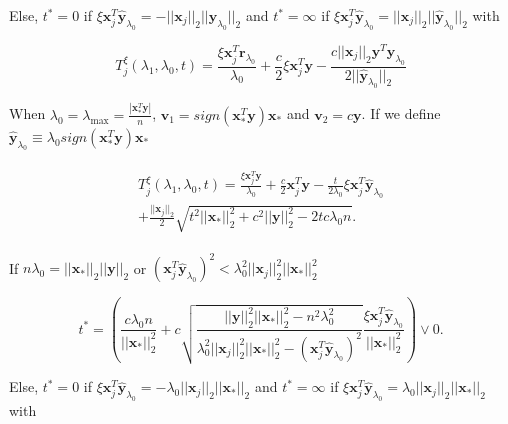 Else, $t^*=0$ if $\xi\boldsymbol x_j^T\hat{\boldsymbol y}_{\lambda_0}=-||\boldsymbol x_j||_2||\hat{\boldsymbol y}_{\lambda_0}||_2$ and $t^*=\infty$ if $\xi\boldsymbol x_j^T\hat{\boldsymbol y}_{\lambda_0}=||\boldsymbol x_j||_2||\hat{\boldsymbol y}_{\lambda_0}||_2$ with

\begin{equation}
    T^\xi_j(\lambda_1,\lambda_0,t)=\frac{\xi \boldsymbol x_j^T \boldsymbol r_{\lambda_0}}{\lambda_0}+\frac{c}{2}\xi\boldsymbol x_j^T\boldsymbol y-\frac{c||\boldsymbol x_j||_2\boldsymbol y^T\hat{\boldsymbol y}_{\lambda_0}}{2||\hat{\boldsymbol y}_{\lambda_0}||_2}
\end{equation}

When $\lambda_0=\lambda_{\max}=\frac{|\boldsymbol x_*^T\boldsymbol y|}{n}$, $\boldsymbol v_1=sign(\boldsymbol x_*^T\boldsymbol y)\boldsymbol x_*$ and $\boldsymbol v_2=c\boldsymbol y$. If we define $\hat{\boldsymbol y}_{\lambda_0}\equiv \lambda_0sign(\boldsymbol x_*^T\boldsymbol y) \boldsymbol x_*$

\begin{gather}
    \begin{aligned}
        T^\xi_j(\lambda_1,\lambda_0,t)= \frac{\xi \boldsymbol x_j^T \boldsymbol y}{\lambda_0}+ \frac{c}{2}\boldsymbol x_j^T\boldsymbol y-\frac{t}{2\lambda_0}\xi\boldsymbol x_j^T\hat{\boldsymbol y}_{\lambda_0}\\
        +\frac{||\boldsymbol x_j||_2}{2}\sqrt{t^2||\boldsymbol x_*||_2^2+c^2||\boldsymbol y||_2^2-2tc\lambda_0n}.
    \end{aligned}
\end{gather}

If $n\lambda_0=||\boldsymbol x_*||_2||\boldsymbol y||_2$ or $(\boldsymbol x_j^T\hat{\boldsymbol y}_{\lambda_0})^2<\lambda_0^2||\boldsymbol x_j||_2^2||\boldsymbol x_*||_2^2$

\begin{equation}
    t^*=\left(\frac{c\lambda_0n}{||\boldsymbol x_*||_2^2}+c\sqrt{\frac{||\boldsymbol y||_2^2||\boldsymbol x_*||_2^2-n^2\lambda_0^2}{\lambda_0^2||\boldsymbol x_j||_2^2||\boldsymbol x_*||_2^2-(\boldsymbol x_j^T\hat{\boldsymbol y}_{\lambda_0})^2}}\frac{\xi\boldsymbol x_j^T\hat{\boldsymbol y}_{\lambda_0}}{||\boldsymbol x_*||_2^2}\right)\vee 0.
\end{equation}

Else, $t^*=0$ if $\xi\boldsymbol x_j^T\hat{\boldsymbol y}_{\lambda_0}=-\lambda_0||\boldsymbol x_j||_2||\boldsymbol x_*||_2$ and $t^*=\infty$ if $\xi\boldsymbol x_j^T\hat{\boldsymbol y}_{\lambda_0}=\lambda_0||\boldsymbol x_j||_2||\boldsymbol x_*||_2$ with

